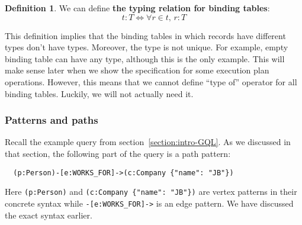 \documentclass[14pt]{constructor-thesis}
\theoremstyle{definition}
\newtheorem{definition}{Definition}
\begin{document}
\begin{definition}
  We can define \textbf{the typing relation for binding tables}:
  $$ t : T \Longleftrightarrow \forall r \in t, \, r : T $$
\end{definition}

This definition implies that the binding tables in which records have different types don't have types. Moreover, the type is not unique. For example, empty binding table can have any type, although this is the only example. This will make sense later when we show the specification for some execution plan operations. However, this means that we cannot define ``type of'' operator for all binding tables. Luckily, we will not actually need it.

\subsubsection{Patterns and paths}
\label{sec:GQL-patterns-and-paths}

Recall the example query from section~\ref{section:intro-GQL}. As we discussed in that section, the following part of the query is a path pattern:
\begin{verbatim}
  (p:Person)-[e:WORKS_FOR]->(c:Company {"name": "JB"})
\end{verbatim}

Here \verb+(p:Person)+ and \verb+(c:Company {"name": "JB"})+ are vertex patterns in their concrete syntax while \verb+-[e:WORKS_FOR]->+ is an edge pattern. We have discussed the exact syntax earlier.

\end{document}

